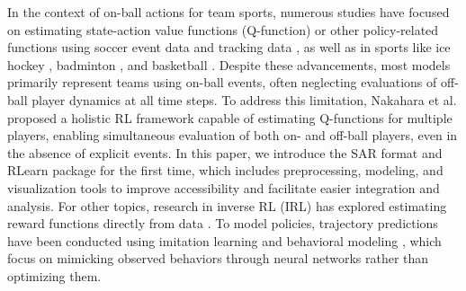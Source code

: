 In the context of on-ball actions for team sports, numerous studies have focused on estimating state-action value functions (Q-function) or other policy-related functions using soccer event data \cite{Liu2020,van2021leaving,van2023markov} and tracking data \cite{rahimian2021towards,rahimian2022beyond,rahimian2024towards}, as well as in sports like ice hockey \cite{Liu2018,Schulte2017}, badminton \cite{ding2022deep}, and basketball \cite{yanai2022q, chen2022reliable}. 
Despite these advancements, most models primarily represent teams using on-ball events, often neglecting evaluations of off-ball player dynamics at all time steps. To address this limitation, Nakahara et al. \cite{nakahara2023action} proposed a holistic RL framework capable of estimating Q-functions for multiple players, enabling simultaneous evaluation of both on- and off-ball players, even in the absence of explicit events. In this paper, we introduce the SAR format and RLearn package for the first time, which includes preprocessing, modeling, and visualization tools to improve accessibility and facilitate easier integration and analysis.
For other topics, research in inverse RL (IRL) has explored estimating reward functions directly from data \cite{Luo2020,rahimian2022inferring}. To model policies, trajectory predictions have been conducted using imitation learning \cite{Le17,le2017data,Teranishi2020,fujii2024decentralized} and behavioral modeling \cite{Zhan19,Yeh19,Li2021,fujii2024estimating}, which focus on mimicking observed behaviors through neural networks rather than optimizing them.